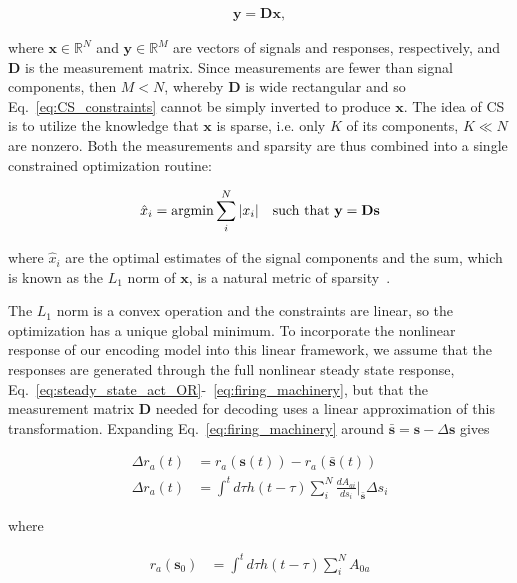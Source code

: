 \documentclass[9pt,lineno]{elife}
\begin{document}
\begin{align}
\mathbf y = \mathbf D\mathbf x,
\label{eq:CS_constraints}
\end{align} 

where $\mathbf x \in \mathbb{R}^N$ and $\mathbf y\in \mathbb{R}^M$ are vectors of signals and responses, respectively, and $\mathbf D$ is the measurement matrix. Since measurements are fewer than signal components, then $M < N$, whereby $\mathbf D$ is wide rectangular and so Eq.~\ref{eq:CS_constraints} cannot be simply inverted to produce $\mathbf x$. The idea of CS is to utilize the knowledge that $\mathbf x$ is sparse, i.e. only $K$ of its components, $K \ll N$ are nonzero. Both the measurements and sparsity are thus combined into a single constrained optimization routine:

\begin{align}
\hat x_i = \textup{argmin} \sum_i^N |x_i| \quad \textup{such that } \mathbf y = \mathbf D\mathbf s
\label{eq:CS}
\end{align}

where $\hat x_i$ are the optimal estimates of the signal components and the sum, which is known as the $L_1$ norm of $\mathbf x$, is a natural metric of sparsity~\citep{CS_donoho}. 

The $L_1$ norm is a convex operation and the constraints are linear, so the optimization has a unique global minimum. To incorporate the nonlinear response of our encoding model into this linear framework, we assume that the responses are generated through the full nonlinear steady state response, Eq.~\ref{eq:steady_state_act_OR}-~\ref{eq:firing_machinery}, but that the measurement matrix $\mathbf D$ needed for decoding uses a linear approximation of this transformation.  Expanding Eq.~\ref{eq:firing_machinery} around $\bar{\mathbf s} = \mathbf s - \Delta \mathbf s$ gives

\begin{align}
\Delta r_a(t) &= r_a(\mathbf s(t)) - r_a(\bar{\mathbf s}(t)) \nonumber \\
\Delta r_a(t) &= \int^t d\tau h(t- \tau)\sum_i^N\frac{dA_{ai}}{ds_i}\bigg|_{\bar{\mathbf s}}\Delta s_i \label{eq:CS_dAct_approx}
\end{align}

where 

\begin{align}
r_a(\mathbf s_0) &= \int^t d\tau h(t- \tau)\sum_i^NA_{0a} 
\label{eq:CS_r_approx} 
\end{align}
\end{document}
